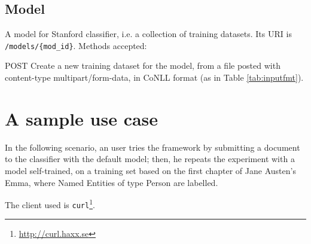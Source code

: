 \documentclass[a4paper,11pt]{report}
\begin{document}
\subsection*{Model}
A model for Stanford classifier, i.e. a collection of training datasets. Its URI is \texttt{/models/\{mod\_id\}}. Methods accepted:
\begin{description}
\item{POST} Create a new training dataset for the model, from a file posted with content-type multipart/form-data, in CoNLL format (as in Table \ref{tab:inputfmt}). 
\end{description}


\section{A sample use case}
In the following scenario, an user tries the framework by submitting a document to the classifier with the default model; then, he repeats the experiment with a model self-trained, on a training set based on the first chapter of Jane Austen's Emma, where Named Entities of type Person are labelled.

The client used is \texttt{curl}\footnote{\url{http://curl.haxx.se}}.

\cleardoublepage
{}

\nocite{*}
\end{document}
